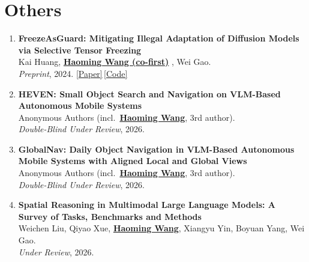 \documentclass[11pt, letterpaper]{article}
\newenvironment{publistcont}{
  \begin{enumerate}[resume*=pubs]
}{\end{enumerate}}
\newcommand{\impactbullet}[1]{%
  \par\vspace{1pt}%
  \begin{itemize}[leftmargin=1.2em, topsep=0pt, itemsep=0pt, parsep=0pt, partopsep=0pt]
    \item #1
  \end{itemize}}
\newcommand{\me}{\underline{\textbf{Haoming Wang}}}
\newcommand{\meco}{\underline{\textbf{Haoming Wang (co-first)}} }
\newcommand{\meanon}{\underline{\textbf{Haoming Wang}}}
\begin{document}
\section{Others}

\begin{publistcont}

\item\label{pub:freeze} \textbf{FreezeAsGuard: Mitigating Illegal Adaptation of Diffusion Models via Selective Tensor Freezing}\\
Kai Huang, \meco, Wei Gao.\\
\textit{Preprint}, 2024. \href{https://haomingwang645.github.io/pdfs/freezeasguard_paper.pdf}{[Paper]}\,\href{https://github.com/pittisl/FreezeAsGuard}{[Code]}

\item\label{pub:heven} \textbf{HEVEN: Small Object Search and Navigation on VLM-Based Autonomous Mobile Systems}\\
Anonymous Authors (incl.\ \meanon, 3rd author).\\
\textit{Double-Blind Under Review}, 2026.

\item\label{pub:globalnav} \textbf{GlobalNav: Daily Object Navigation in VLM-Based Autonomous Mobile Systems with Aligned Local and Global Views}\\
Anonymous Authors (incl.\ \meanon, 3rd author).\\
\textit{Double-Blind Under Review}, 2026.



\item\label{pub:survey} \textbf{Spatial Reasoning in Multimodal Large Language Models: A Survey of Tasks, Benchmarks and Methods}\\
Weichen Liu, Qiyao Xue, \me, Xiangyu Yin, Boyuan Yang, Wei Gao.\\
\textit{Under Review}, 2026.
\end{publistcont}
\end{document}
